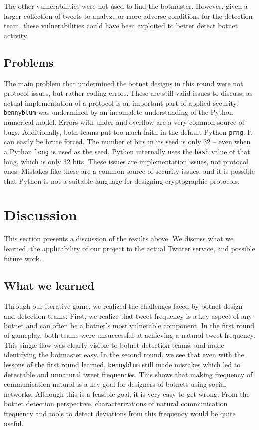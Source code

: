 \documentclass[11pt, oneside]{article} %
\numberwithin{equation}{section} %
\numberwithin{figure}{section} %
\numberwithin{table}{section} %
\renewcommand{\c}[1]{\texttt{#1}}
\newcommand{\code}[1]{\c{#1}}
\newcommand{\teambb}{\c{bennyblum}}
\begin{document}
			The other vulnerabilities were not used to find the botmaster.  However, given a larger collection of tweets to analyze or more adverse conditions for the detection team, these vulnerabilities could have been exploited to better detect botnet activity.

	\subsection{Problems}
		The main problem that undermined the botnet designs in this round were not protocol issues, but rather coding errors. These are still valid issues to discuss, as actual implementation of a protocol is an important part of applied security. \teambb{} was undermined by an incomplete understanding of the Python numerical model. Errors with under and overflow are a very common source of bugs. Additionally, both teams put too much faith in the default Python \c{prng}. It can easily be brute forced. The number of bits in its seed is only 32 -- even when a Python \code{long} is used as the seed, Python internally uses the \c{hash} value of that long, which is only 32 bits. These issues are implementation issues, not protocol ones. Mistakes like these are a common source of security issues, and it is possible that Python is not a suitable language for designing cryptographic protocols.

\section{Discussion}
	This section presents a discussion of the results above. We discuss what we learned, the applicability of our project to the actual Twitter service, and possible future work.

	\subsection{What we learned}
		Through our iterative game, we realized the challenges faced by botnet design and detection teams. First, we realize that tweet frequency is a key aspect of any botnet and can often be a botnet's most vulnerable component. In the first round of gameplay, both teams were unsuccessful at achieving a natural tweet frequency. This single flaw was clearly visible to botnet detection teams, and made identifying the botmaster easy. In the second round, we see that even with the lessons of the first round learned, \teambb{} still made mistakes which led to detectable and unnatural tweet frequencies. This shows that making frequency of communication natural is a key goal for designers of botnets using social networks. Although this is a feasible goal, it is very easy to get wrong. From the botnet detection perspective, characterizations of natural communication frequency and tools to detect deviations from this frequency would be quite useful.
\end{document}
